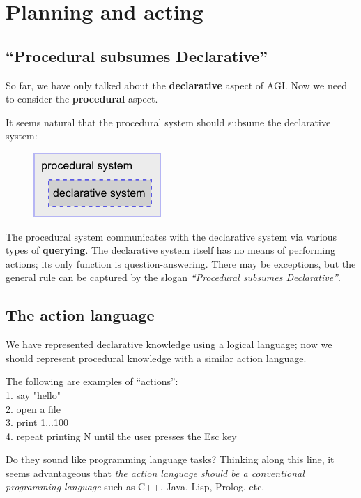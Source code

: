 \chapter{Planning and acting}
\label{ch:planning-acting}
\minitoc

\section{``Procedural subsumes Declarative''}
\label{sec:proc-subsumes-decl}

So far, we have only talked about the \textbf{declarative} aspect of AGI.  Now we need to consider the \textbf{procedural} aspect.

It seems natural that the procedural system should subsume the declarative system:
\begin{figure}[H]
\centering
\includegraphics{Procedural-subsumes-Declarative-system.png}
\end{figure}
\vspace{-0.5cm}

The procedural system communicates with the declarative system via various types of \textbf{querying}.  The declarative system itself has no means of performing actions;  its only function is question-answering.  There may be exceptions, but the general rule can be captured by the slogan \textit{``Procedural subsumes Declarative''}.

\section{The action language}
\label{sec:ActionLanguage}

We have represented declarative knowledge using a logical language; now we should represent procedural knowledge with a similar action language.

The following are examples of ``actions'':\\
1. say "hello"\\
2. open a file\\
3. print 1...100\\
4. repeat printing N until the user presses the Esc key

Do they sound like programming language tasks?  Thinking along this line, it seems advantageous that \textit{the action language should be a conventional programming language} such as C++, Java, Lisp,  Prolog, etc.

